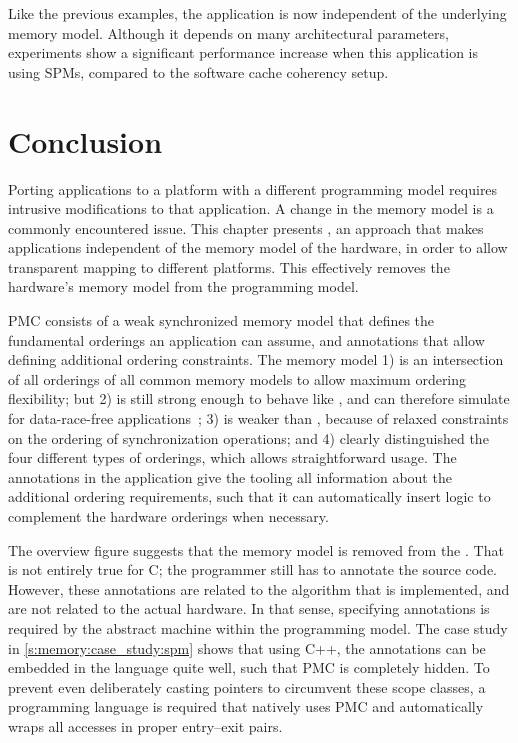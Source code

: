 Like the previous examples, the application is now independent of the underlying memory model.
Although it depends on many architectural parameters, experiments show a significant performance increase when this application is using \acp{SPM}, compared to the software cache coherency setup.


\section{Conclusion}
\label{s:memory:conclusion}

Porting applications to a platform with a different programming model requires intrusive modifications to that application.
A change in the memory model is a commonly encountered issue.
This chapter presents , an approach that makes applications independent of the memory model of the hardware, in order to allow transparent mapping to different platforms.
This effectively removes the hardware's memory model from the programming model.

\Ac{PMC} consists of a weak synchronized memory model that defines the fundamental orderings an application can assume, and annotations that allow defining additional ordering constraints.
The memory model
1) is an intersection of all orderings of all common memory models to allow maximum ordering flexibility; but
2) is still strong enough to behave like , and can therefore simulate  for data-race-free applications~\cite{gharachorloo:release_consistency};
3) is weaker than , because of relaxed constraints on the ordering of synchronization operations; and
4) clearly distinguished the four different types of orderings, which allows straightforward usage.
The annotations in the application give the tooling all information about the additional ordering requirements, such that it can automatically insert logic to complement the hardware orderings when necessary.

The overview figure \chapfigpageref suggests that the memory model is removed from the .
That is not entirely true for C; the programmer still has to annotate the source code.
However, these annotations are related to the algorithm that is implemented, and are not related to the actual hardware.
In that sense, specifying annotations is required by the abstract machine within the programming model.
The case study in \cref{s:memory:case_study:spm} shows that using C++, the annotations can be embedded in the language quite well, such that \ac{PMC} is completely hidden.
To prevent even deliberately casting pointers to circumvent these scope classes, a programming language is required that natively uses \ac{PMC} and automatically wraps all accesses in proper entry--exit pairs.


